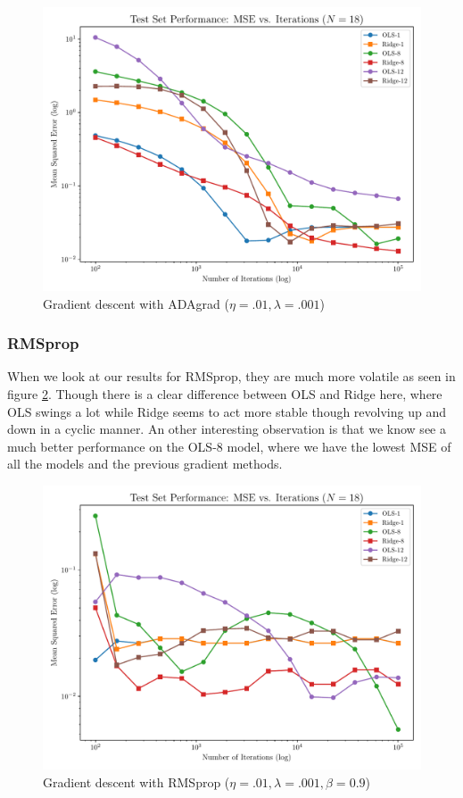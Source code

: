 \documentclass[twocolumn,aps]{revtex4}
\begin{document}
\begin{figure}[h]
    \centering
    \includegraphics[width=.95 \linewidth]{Figures/OLS_Ridge_ADAgrad.pdf}
    \caption{Gradient descent with ADAgrad ($\eta=.01, \lambda=.001$)}
    \label{fig:GradADAgrad}
\end{figure}


\subsubsection{RMSprop}
When we look at our results for RMSprop, they are much more volatile as seen in figure \ref{fig:GradRMSprop}.
Though there is a clear difference between OLS and Ridge here, where OLS swings a lot while Ridge seems to act more stable though revolving up and down in a cyclic manner.
An other interesting observation is that we know see a much better performance on the OLS-8 model, where we have the lowest MSE of all the models and the previous gradient methods.
\\

\begin{figure}[h]
    \centering
    \includegraphics[width=.95 \linewidth]{Figures/OLS_Ridge_RMSprop.pdf}
    \caption{Gradient descent with RMSprop ($\eta=.01, \lambda=.001, \beta=0.9$)}
    \label{fig:GradRMSprop}
\end{figure}
\end{document}
